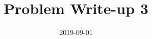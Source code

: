 \documentclass[a4paper,12pt]{article}
\title{Problem Write-up 3}
\date{2019-09-01}
\begin{document}
    \begin{problem}
        
    \end{problem}

    \begin{answer}
        
    \end{answer}
\end{document}

